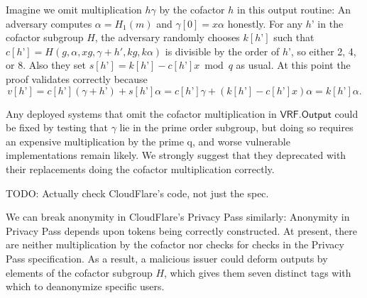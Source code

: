 \documentclass{article}
\newcommand{\algo}[1]{\ensuremath{\mathsf{#1}}}
\newcommand{\VRF}{\algo{VRF}}
\newcommand{\Output}{\algo{Output}}
\begin{document}
Imagine we omit multiplication $h \gamma$ by the cofactor $h$ in this output routine:  An adversary computes $\alpha = H_1(m)$ and $\gamma[0] = x \alpha$ honestly.  For any $h’$ in the cofactor subgroup $H$, the adversary randomly chooses $k[h’]$ such that $c[h’] = H(g,\alpha,x g,\gamma+h',kg,k\alpha)$ is divisible by the order of $h’$, so either 2, 4, or 8.  Also they set $s[h’] = k[h’] - c[h’] x \bmod q$ as usual.  At this point the proof validates correctly because 
$$  v[h’] = c[h’] (\gamma + h’) + s[h’] \alpha = c[h’] \gamma + ( k[h’] - c[h’] x) \alpha = k[h’] \alpha . $$

Any deployed systems that omit the cofactor multiplication in $\VRF.\Output$ could be fixed by testing that $\gamma$ lie in the prime order subgroup, but doing so requires an expensive multiplication by the prime q, and worse vulnerable implementations remain likely.  We strongly suggest that they deprecated with their replacements doing the cofactor multiplication correctly.

TODO: Actually check CloudFlare's code, not just the spec.

We can break anonymity in CloudFlare’s Privacy Pass similarly:  Anonymity in Privacy Pass depends upon tokens being correctly constructed.  At present, there are neither multiplication by the cofactor nor checks for checks in the Privacy Pass specification.  As a result, a malicious issuer could deform outputs by elements of the cofactor subgroup $H$, which gives them seven distinct tags with which to deanonymize specific users.  
\end{document}

